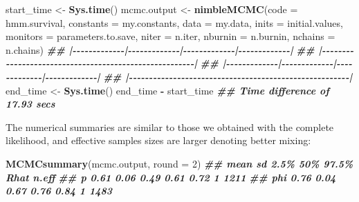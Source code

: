 \documentclass[
  12pt,
]{krantz}
\newenvironment{Shaded}{\begin{snugshade}}{\end{snugshade}}
\newcommand{\AttributeTok}[1]{\textcolor[rgb]{0.13,0.29,0.53}{#1}}
\newcommand{\DecValTok}[1]{\textcolor[rgb]{0.00,0.00,0.81}{#1}}
\newcommand{\DocumentationTok}[1]{\textcolor[rgb]{0.56,0.35,0.01}{\textbf{\textit{#1}}}}
\newcommand{\FunctionTok}[1]{\textcolor[rgb]{0.13,0.29,0.53}{\textbf{#1}}}
\newcommand{\NormalTok}[1]{#1}
\newcommand{\OtherTok}[1]{\textcolor[rgb]{0.56,0.35,0.01}{#1}}
\newcommand{\SpecialCharTok}[1]{\textcolor[rgb]{0.81,0.36,0.00}{\textbf{#1}}}
\begin{document}
\begin{Shaded}
\begin{Highlighting}[]
\NormalTok{start\_time }\OtherTok{\textless{}{-}} \FunctionTok{Sys.time}\NormalTok{()}
\NormalTok{mcmc.output }\OtherTok{\textless{}{-}} \FunctionTok{nimbleMCMC}\NormalTok{(}\AttributeTok{code =}\NormalTok{ hmm.survival,}
                          \AttributeTok{constants =}\NormalTok{ my.constants,}
                          \AttributeTok{data =}\NormalTok{ my.data,}
                          \AttributeTok{inits =}\NormalTok{ initial.values,}
                          \AttributeTok{monitors =}\NormalTok{ parameters.to.save,}
                          \AttributeTok{niter =}\NormalTok{ n.iter,}
                          \AttributeTok{nburnin =}\NormalTok{ n.burnin,}
                          \AttributeTok{nchains =}\NormalTok{ n.chains)}
\DocumentationTok{\#\# |{-}{-}{-}{-}{-}{-}{-}{-}{-}{-}{-}{-}{-}|{-}{-}{-}{-}{-}{-}{-}{-}{-}{-}{-}{-}{-}|{-}{-}{-}{-}{-}{-}{-}{-}{-}{-}{-}{-}{-}|{-}{-}{-}{-}{-}{-}{-}{-}{-}{-}{-}{-}{-}|}
\DocumentationTok{\#\# |{-}{-}{-}{-}{-}{-}{-}{-}{-}{-}{-}{-}{-}{-}{-}{-}{-}{-}{-}{-}{-}{-}{-}{-}{-}{-}{-}{-}{-}{-}{-}{-}{-}{-}{-}{-}{-}{-}{-}{-}{-}{-}{-}{-}{-}{-}{-}{-}{-}{-}{-}{-}{-}{-}{-}|}
\DocumentationTok{\#\# |{-}{-}{-}{-}{-}{-}{-}{-}{-}{-}{-}{-}{-}|{-}{-}{-}{-}{-}{-}{-}{-}{-}{-}{-}{-}{-}|{-}{-}{-}{-}{-}{-}{-}{-}{-}{-}{-}{-}{-}|{-}{-}{-}{-}{-}{-}{-}{-}{-}{-}{-}{-}{-}|}
\DocumentationTok{\#\# |{-}{-}{-}{-}{-}{-}{-}{-}{-}{-}{-}{-}{-}{-}{-}{-}{-}{-}{-}{-}{-}{-}{-}{-}{-}{-}{-}{-}{-}{-}{-}{-}{-}{-}{-}{-}{-}{-}{-}{-}{-}{-}{-}{-}{-}{-}{-}{-}{-}{-}{-}{-}{-}{-}{-}|}
\NormalTok{end\_time }\OtherTok{\textless{}{-}} \FunctionTok{Sys.time}\NormalTok{()}
\NormalTok{end\_time }\SpecialCharTok{{-}}\NormalTok{ start\_time}
\DocumentationTok{\#\# Time difference of 17.93 secs}
\end{Highlighting}
\end{Shaded}

The numerical summaries are similar to those we obtained with the complete likelihood, and effective samples sizes are larger denoting better mixing:

\begin{Shaded}
\begin{Highlighting}[]
\FunctionTok{MCMCsummary}\NormalTok{(mcmc.output, }\AttributeTok{round =} \DecValTok{2}\NormalTok{)}
\DocumentationTok{\#\#     mean   sd 2.5\%  50\% 97.5\% Rhat n.eff}
\DocumentationTok{\#\# p   0.61 0.06 0.49 0.61  0.72    1  1211}
\DocumentationTok{\#\# phi 0.76 0.04 0.67 0.76  0.84    1  1483}
\end{Highlighting}
\end{Shaded}
\end{document}
